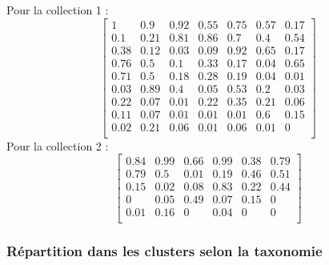 Pour la collection 1 :
\[\begin{bmatrix} 1 &0.9 &0.92 &0.55 &0.75 &0.57 &0.17 \\0.1 &0.21 &0.81 &0.86 &0.7 &0.4 &0.54 \\0.38 &0.12 &0.03 &0.09 &0.92 &0.65 &0.17 \\0.76 &0.5 &0.1 &0.33 &0.17 &0.04 &0.65 \\0.71 &0.5 &0.18 &0.28 &0.19 &0.04 &0.01 \\0.03 &0.89 &0.4 &0.05 &0.53 &0.2 &0.03 \\0.22 &0.07 &0.01 &0.22 &0.35 &0.21 &0.06 \\0.11 &0.07 &0.01 &0.01 &0.01 &0.6 &0.15 \\0.02 &0.21 &0.06 &0.01 &0.06 &0.01 &0 \\ \end{bmatrix}\]
Pour la collection 2 :
\[\begin{bmatrix} 0.84 &0.99 &0.66 &0.99 &0.38 &0.79 \\0.79 &0.5 &0.01 &0.19 &0.46 &0.51 \\0.15 &0.02 &0.08 &0.83 &0.22 &0.44 \\0 &0.05 &0.49 &0.07 &0.15 &0 \\0.01 &0.16 &0 &0.04 &0 &0 \\ \end{bmatrix}\]

\hypertarget{ruxe9partition-dans-les-clusters-selon-la-taxonomie-1}{%
\subsubsection{Répartition dans les clusters selon la
taxonomie}\label{ruxe9partition-dans-les-clusters-selon-la-taxonomie-1}}


